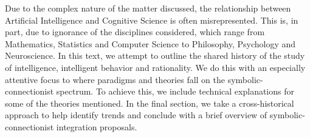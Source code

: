 \documentclass[../main.tex]{subfiles}
\begin{document}
Due to the complex nature of the matter discussed, the relationship between Artificial Intelligence and Cognitive Science is often misrepresented. This is, in part, due to ignorance of the disciplines considered, which range from Mathematics, Statistics and Computer Science to Philosophy, Psychology and Neuroscience. In this text, we attempt to outline the shared history of the study of intelligence, intelligent behavior and rationality. We do this with an especially attentive focus to where paradigms and theories fall on the symbolic-connectionist spectrum. To achieve this, we include technical explanations for some of the theories mentioned. In the final section, we take a cross-historical approach to help identify trends and conclude with a brief overview of symbolic-connectionist integration proposals.
\end{document}
